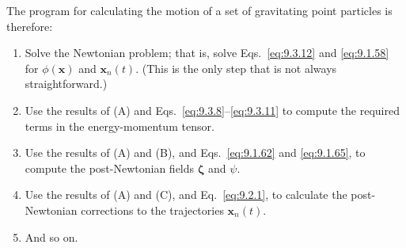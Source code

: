 The program for calculating the motion of a set of gravitating point
particles is therefore:
\begin{enumerate}
  \item[(A)] Solve the Newtonian problem; that is, solve
  Eqs.~\eqref{eq:9.3.12} and \eqref{eq:9.1.58} for
  \(\phi(\mathbf x)\) and \(\mathbf x_n(t)\). (This is the only step that
  is not always straightforward.)
  \item[(B)] Use the results of (A) and
  Eqs.~\eqref{eq:9.3.8}--\eqref{eq:9.3.11} to compute the required terms
  in the energy-momentum tensor.
  \item[(C)] Use the results of (A) and (B), and
  Eqs.~\eqref{eq:9.1.62} and \eqref{eq:9.1.65}, to compute the
  post-Newtonian fields \(\boldsymbol\zeta\) and \(\psi\).
  \item[(D)] Use the results of (A) and (C), and Eq.~\eqref{eq:9.2.1}, to
  calculate the post-Newtonian corrections to the trajectories
  \(\mathbf x_n(t)\).
  \item[(E)] And so on.
\end{enumerate}

